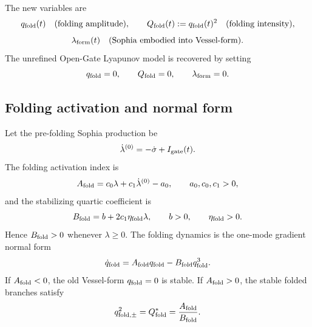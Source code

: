 \documentclass[11pt,a4paper]{article}
\newcommand{\Igate}{I_{\rm gate}}
\theoremstyle{plain}
\theoremstyle{definition}
\theoremstyle{remark}
\begin{document}
The new variables are
\begin{equation}
  q_{\rm fold}(t)\quad\text{(folding amplitude)},
  \qquad
  Q_{\rm fold}(t):=q_{\rm fold}(t)^2\quad\text{(folding intensity)},
\end{equation}
\begin{equation}
  \lambda_{\rm form}(t)\quad\text{(Sophia embodied into Vessel-form)}.
\end{equation}
The unrefined Open-Gate Lyapunov model is recovered by setting
\begin{equation}
  q_{\rm fold}=0,
  \qquad
  Q_{\rm fold}=0,
  \qquad
  \lambda_{\rm form}=0.
\end{equation}

\subsection{Folding activation and normal form}
Let the pre-folding Sophia production be
\begin{equation}
  \dot\lambda^{(0)}=-\dot\sigma+\Igate(t).
\end{equation}
The folding activation index is
\begin{equation}
  A_{\rm fold}=c_0\lambda+c_1\dot\lambda^{(0)}-a_0,
  \qquad
  a_0,c_0,c_1>0,
\end{equation}
and the stabilizing quartic coefficient is
\begin{equation}
  B_{\rm fold}=b+2c_1\eta_{\rm fold}\lambda,
  \qquad
  b>0,
  \qquad
  \eta_{\rm fold}>0.
\end{equation}
Hence $B_{\rm fold}>0$ whenever $\lambda\ge0$. The folding dynamics is the
one-mode gradient normal form
\begin{equation}
  \dot q_{\rm fold}=A_{\rm fold}q_{\rm fold}
  -B_{\rm fold}q_{\rm fold}^{3}.
\end{equation}
If $A_{\rm fold}<0$, the old Vessel-form $q_{\rm fold}=0$ is stable. If
$A_{\rm fold}>0$, the stable folded branches satisfy
\begin{equation}
  q_{\rm fold,\pm}^{2}=Q_{\rm fold}^{*}
  =\frac{A_{\rm fold}}{B_{\rm fold}}.
\end{equation}
\end{document}
